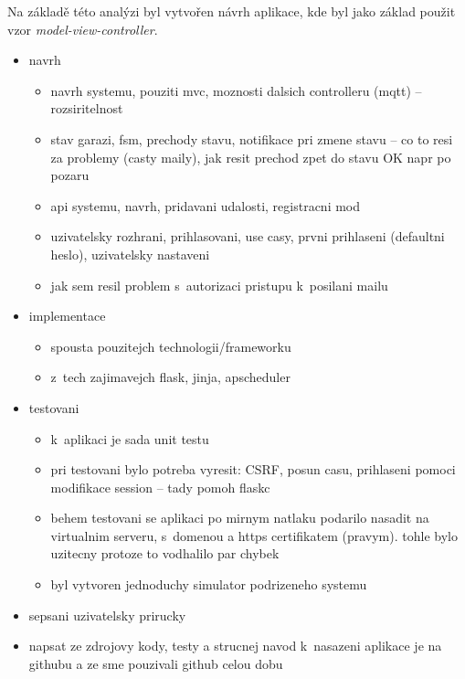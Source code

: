 Na základě této analýzi byl vytvořen návrh aplikace, kde byl jako základ použit vzor \textit{model-view-controller}.

\begin{itemize}
    \item navrh
    \begin{itemize}
        \item navrh systemu, pouziti mvc, moznosti dalsich controlleru (mqtt) -- rozsiritelnost
        \item stav garazi, fsm, prechody stavu, notifikace pri zmene stavu -- co to resi za problemy (casty maily), jak resit prechod zpet do stavu OK napr po pozaru
        \item api systemu, navrh, pridavani udalosti, registracni mod
        \item uzivatelsky rozhrani, prihlasovani, use casy, prvni prihlaseni (defaultni heslo), uzivatelsky nastaveni
        \item jak sem resil problem s~autorizaci pristupu k~posilani mailu
    \end{itemize}
    \item implementace
    \begin{itemize}
        \item spousta pouzitejch technologii/frameworku
        \item z~tech zajimavejch flask, jinja, apscheduler
    \end{itemize}
    \item testovani
    \begin{itemize}
        \item k~aplikaci je sada unit testu
        \item pri testovani bylo potreba vyresit: CSRF, posun casu, prihlaseni pomoci modifikace session -- tady pomoh flaskc
        \item behem testovani se aplikaci po mirnym natlaku podarilo nasadit na virtualnim serveru, s~domenou a https certifikatem (pravym). tohle bylo uzitecny protoze to vodhalilo par chybek
        \item byl vytvoren jednoduchy simulator podrizeneho systemu
    \end{itemize}
    \item sepsani uzivatelsky prirucky
    \item napsat ze zdrojovy kody, testy a strucnej navod k~nasazeni aplikace je na githubu a ze sme pouzivali github celou dobu
\end{itemize}